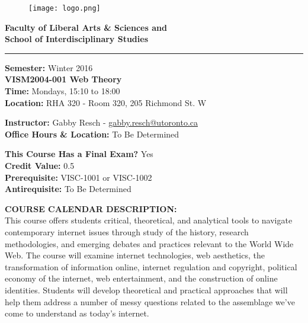 \documentclass[10pt]{article}
\begin{document}
\begin{figure}
	\raggedleft
	\texttt{[image: logo.png]}
\end{figure}

\textbf{\LARGE{Faculty of Liberal Arts \& Sciences and \\
School of Interdisciplinary Studies}}\newline
\rule{\textwidth}{1pt}

\textbf{Semester:} Winter 2016\\
\textbf{VISM2004-001 Web Theory}\\
\textbf{Time:} Mondays, 15:10 to 18:00\\
\textbf{Location:} RHA 320 - Room 320, 205 Richmond St. W

\textbf{Instructor:} Gabby Resch - \href{mailto:gabby.resch@utoronto.ca}{gabby.resch@utoronto.ca}\\
\textbf{Office Hours \& Location:} To Be Determined

\textbf{This Course Has a Final Exam?} Yes\\
\textbf{Credit Value:} 0.5\\
\textbf{Prerequisite:} VISC-1001 or VISC-1002\\
\textbf{Antirequisite:} To Be Determined

\textbf{COURSE CALENDAR DESCRIPTION:}\\
This course offers students critical, theoretical, and analytical tools to navigate contemporary internet issues through study of the history, research methodologies, and emerging debates and practices relevant to the World Wide Web. The course will examine internet technologies, web aesthetics, the transformation of information online, internet regulation and copyright, political economy of the internet, web entertainment, and the construction of online identities. Students will develop theoretical and practical approaches that will help them address a number of messy questions related to the assemblage we've come to understand as today's internet.
\end{document}
